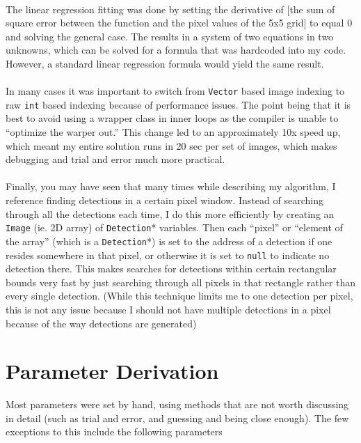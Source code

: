\documentclass[letterpaper,options]{article}
\begin{document}
\paragraph{}
The linear regression fitting was done by setting the derivative of [the sum of square error between the function and the pixel values of the 5x5 grid] to equal 0 and solving the general case. The results in a system of two equations in two unknowns, which can be solved for a formula that was hardcoded into my code. However, a standard linear regression formula would yield the same result.
\paragraph{}
In many cases it was important to switch from \texttt{Vector} based image indexing to raw \texttt{int} based indexing because of performance issues. The point being that it is best to avoid using a wrapper class in inner loops as the compiler is unable to ``optimize the warper out.'' This change led to an approximately 10x speed up, which meant my entire solution runs in 20 sec per set of images, which makes debugging and trial and error much more practical.
\paragraph{}
Finally, you may have seen that many times while describing my algorithm, I reference finding detections in a certain pixel window. Instead of searching through all the detections each time, I do this more efficiently by creating an \texttt{Image} (ie. 2D array) of \texttt{Detection}\** variables. Then each “pixel” or “element of the array” (which is a \texttt{Detection}\**) is set to the address of a detection if one resides somewhere in that pixel, or otherwise it is set to \texttt{null} to indicate no detection there. This makes searches for detections within certain rectangular bounds very fast by just searching through all pixels in that rectangle rather than every single detection. (While this technique limits me to  one detection per pixel, this is not any issue because I should not have multiple detections in a pixel because of the way detections are generated)
\section{Parameter Derivation}
Most parameters were set by hand, using methods that are not worth discussing in detail (such as trial and error, and guessing and being close enough). The few exceptions to this include the following parameters
\end{document}
